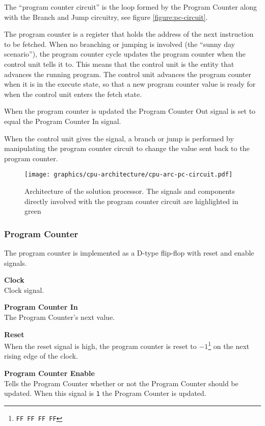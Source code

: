 The ``program counter circuit'' is the loop formed by the Program Counter along with the Branch and Jump circuitry, see figure \vref{figure:pc-circuit}.

The program counter is a register that holds the address of the next instruction to be fetched.
When no branching or jumping is involved (the ``sunny day scenario''), the program counter cycle updates the program counter when the control unit tells it to.
This means that the control unit is the entity that advances the running program.
The control unit advances the program counter when it is in the execute state, so that a new program counter value is ready for when the control unit enters the fetch state.

When the program counter is updated the Program Counter Out signal is set to equal the Program Counter In signal.

When the control unit gives the signal, a branch or jump is performed by manipulating the program counter circuit to change the value sent back to the program counter.

\begin{figure}[h!]
	\begin{center}
		\texttt{[image: graphics/cpu-architecture/cpu-arc-pc-circuit.pdf]}
		\caption{Architecture of the solution processor. The signals and components directly involved with the program counter circuit are highlighted in green}
		\label{figure:pc-circuit}
	\end{center}
\end{figure}


\subsubsection{Program Counter}

The program counter is implemented as a D-type flip-flop with reset and enable signals.


\begin{description}
\item{\textbf{Clock}} \\

Clock signal.

\item{\textbf{Program Counter In}} \\

The Program Counter's next value.

\item{\textbf{Reset}} \\

When the reset signal is high, the program counter is reset to $-1$\footnote{\texttt{FF FF FF FF}} on the next rising edge of the clock.

\item{\textbf{Program Counter Enable}} \\

Tells the Program Counter whether or not the Program Counter should be updated.
When this signal is \texttt{1} the Program Counter is updated.

\end{description}

